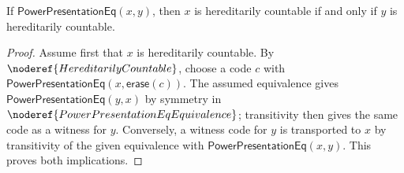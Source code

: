 \begin{lemma}
If $\mathsf{PowerPresentationEq}(x,y)$, then $x$ is hereditarily
countable if and only if $y$ is hereditarily countable.
\end{lemma}
\begin{proof}
Assume first that $x$ is hereditarily countable.  By
$\noderef{HereditarilyCountable}$, choose a code $c$ with
$\mathsf{PowerPresentationEq}(x,\mathsf{erase}(c))$.  The assumed
equivalence gives $\mathsf{PowerPresentationEq}(y,x)$ by symmetry in
$\noderef{PowerPresentationEqEquivalence}$; transitivity then gives the
same code as a witness for $y$.  Conversely, a witness code for $y$ is
transported to $x$ by transitivity of the given equivalence with
$\mathsf{PowerPresentationEq}(x,y)$.  This proves both implications.
\end{proof}
